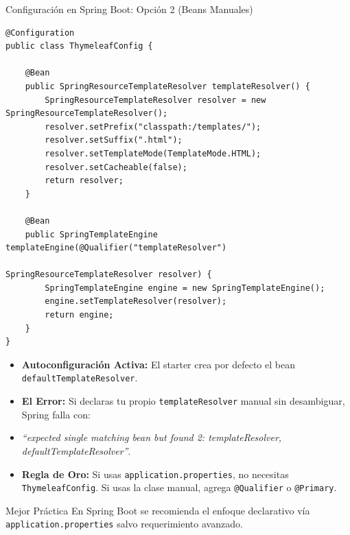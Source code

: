 \documentclass[aspectratio=169]{beamer}
\begin{document}
\begin{frame}[fragile]{Configuraci\'on en Spring Boot: Opci\'on 2 (Beans Manuales)}
\begin{lstlisting}[style=SpringCodeStyle,basicstyle=\ttfamily\fontsize{5.2pt}{6.5pt}\selectfont\color{codeText}]
@Configuration
public class ThymeleafConfig {

    @Bean
    public SpringResourceTemplateResolver templateResolver() {
        SpringResourceTemplateResolver resolver = new SpringResourceTemplateResolver();
        resolver.setPrefix("classpath:/templates/");
        resolver.setSuffix(".html");
        resolver.setTemplateMode(TemplateMode.HTML);
        resolver.setCacheable(false);
        return resolver;
    }

    @Bean
    public SpringTemplateEngine templateEngine(@Qualifier("templateResolver") 
                                               SpringResourceTemplateResolver resolver) {
        SpringTemplateEngine engine = new SpringTemplateEngine();
        engine.setTemplateResolver(resolver);
        return engine;
    }
}
\end{lstlisting}
\end{frame}

  {
    \begin{itemize}
      \item \textbf{Autoconfiguraci\'on Activa:} El starter crea por defecto el bean \texttt{defaultTemplateResolver}.
      \item \textbf{El Error:} Si declaras tu propio \texttt{templateResolver} manual sin desambiguar, Spring falla con:
      \item \textit{``expected single matching bean but found 2: templateResolver, defaultTemplateResolver''}.
      \item \textbf{Regla de Oro:} Si usas \texttt{application.properties}, no necesitas \texttt{ThymeleafConfig}. Si usas la clase manual, agrega \texttt{@Qualifier} o \texttt{@Primary}.
    \end{itemize}
  }
  {Mejor Pr\'actica}
  {En Spring Boot se recomienda el enfoque declarativo v\'ia \texttt{application.properties} salvo requerimiento avanzado.}

\end{document}
